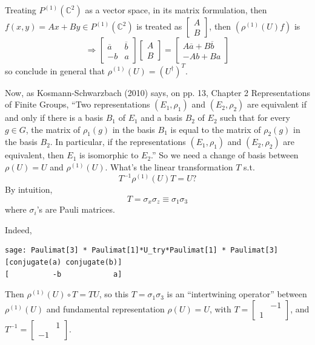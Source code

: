 \documentclass[10pt]{amsart}
\begin{document}
\begin{multicols*}{2}
Treating $P^{(1)}(\mathbb{C}^2)$ as a vector space, in its matrix formulation, then $f(x,y) = Ax+By \in P^{(1)}(\mathbb{C}^2)$ is treated as $\left[ \begin{matrix} A \\ B \end{matrix} \right]$, then $(\rho^{(1)}(U)f)$ is 
\[
\Longrightarrow \left[ \begin{matrix} \overline{a} & \overline{b} \\ -b & a \end{matrix} \right]\left[ \begin{matrix} A \\ B \end{matrix} \right] = \left[ \begin{matrix} A\overline{a} + B\overline{b}  \\ -Ab + Ba \end{matrix} \right]
\]
so conclude in general that $\rho^{(1)}(U) = (U^{\dag})^T$.  

Now, as Kosmann-Schwarzbach (2010) \cite{YKosmann-Schwarzbach2010} says, on pp. 13, Chapter 2 Representations of Finite Groups, ``Two representations $(E_1,\rho_1)$ and $(E_2,\rho_2)$ are equivalent if and only if there is a basis $B_1$ of $E_1$ and a basis $B_2$ of $E_2$ such that for every $g\in G$, the matrix of $\rho_1(g)$ in the basis $B_1$ is equal to the matrix of $\rho_2(g)$ in the basis $B_2$.  In particular, if the representations $(E_1,\rho_1)$ and $(E_2,\rho_2)$ are equivalent, then $E_1$ is isomorphic to $E_2$.''  So we need a change of basis between $\rho(U) = U$ and $\rho^{(1)}(U)$.  What's the linear transformation $T$ s.t.
\[
T^{-1} \rho^{(1)}(U) T = U ?
\]  
By intuition, 
\[
T = \sigma_x \sigma_z \equiv \sigma_1 \sigma_3
\]
where $\sigma_i$'s are Pauli matrices.  

Indeed, 
\begin{lstlisting}
sage: Paulimat[3] * Paulimat[1]*U_try*Paulimat[1] * Paulimat[3]
[conjugate(a) conjugate(b)]
[          -b            a]
\end{lstlisting}

Then $\rho^{(1)}(U)\circ T = TU$, so this $T = \sigma_1 \sigma_3$ is an ``intertwining operator'' between $\rho^{(1)}(U)$ and fundamental representation $\rho(U) = U$, with $T = \left[ \begin{matrix} & - 1 \\
1 & \end{matrix} \right]$, and $T^{-1} = \left[ \begin{matrix} & 1 \\ -1 & \end{matrix} \right]$.  


\end{multicols*}
\end{document}
